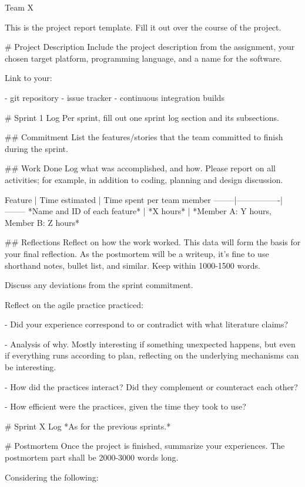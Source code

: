 \documentclass[14]{article}
\begin{document}
\iffalse
  Team X
%

This is the project report template.
Fill it out over the course of the project.

# Project Description
Include the project description from the assignment,
your chosen target platform,
programming language,
and a name for the software.

Link to your:

- git repository
- issue tracker
- continuous integration builds

# Sprint 1 Log
Per sprint, fill out one sprint log section and its subsections.

## Commitment
List the features/stories that the team committed to finish during the sprint.

## Work Done
Log what was accomplished, and how.
Please report on all activities; for example, in addition to coding, planning and design discussion.

Feature | Time estimated | Time spent per team member
--------|----------------|--------
*Name and ID of each feature* | *X hours* | *Member A: Y hours, Member B: Z hours*

## Reflections
Reflect on how the work worked.
This data will form the basis for your final reflection.
As the postmortem will be a writeup, it's fine to use shorthand notes, bullet list, and similar.
Keep within 1000-1500 words.

Discuss any deviations from the sprint commitment.

Reflect on the agile practice practiced:

- Did your experience correspond to or contradict with what literature claims?

    - Analysis of why. Mostly interesting if something unexpected happens, but even
      if everything runs according to plan, reflecting on the underlying mechanisms
      can be interesting.

- How did the practices interact?
  Did they complement or counteract each other?

- How efficient were the practices, given the time they took to use?


# Sprint X Log
*As for the previous sprints.*


# Postmortem
Once the project is finished, summarize your experiences.
The postmortem part shall be 2000-3000 words long.

Considering the following:
\end{document}
